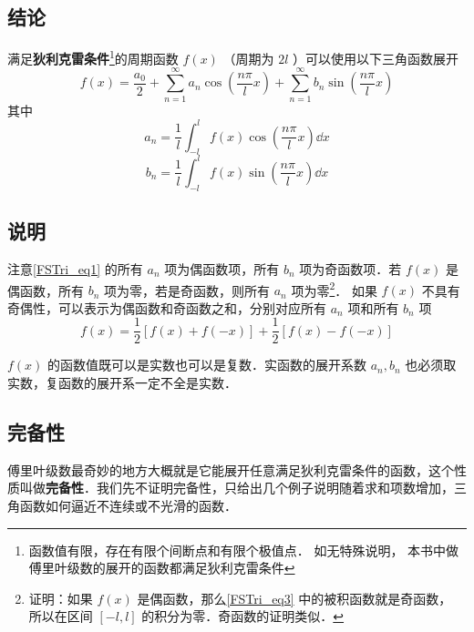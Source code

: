 


\subsection{结论}
满足\textbf{狄利克雷条件}\footnote{函数值有限，存在有限个间断点和有限个极值点． 如无特殊说明， 本书中做傅里叶级数的展开的函数都满足狄利克雷条件}的周期函数 $f(x)$ （周期为 $2l$ ）可以使用以下三角函数展开
\begin{equation}\label{FSTri_eq1}
f( x ) = \frac{a_0}{2} + \sum_{n = 1}^\infty a_n \cos (\frac{n\pi}{l}x) + \sum_{n = 1}^\infty b_n \sin (\frac{n\pi}{l}x)
\end{equation}
其中
\begin{equation}\label{FSTri_eq2}
a_n = \frac{1}{l} \int_{ - l}^l f( x )\cos(\frac{n\pi}{l}x) \dd{x} 
\end{equation}
\begin{equation}\label{FSTri_eq3}
b_n = \frac{1}{l} \int_{ - l}^l f( x )\sin(\frac{n\pi}{l}x) \dd{x}
\end{equation}

\subsection{说明}
注意\autoref{FSTri_eq1} 的所有 $a_n$ 项为偶函数项，所有 $b_n$ 项为奇函数项．若 $f(x)$ 是偶函数，所有 $b_n$ 项为零，若是奇函数，则所有 $a_n$ 项为零\footnote{证明：如果 $f(x)$ 是偶函数，那么\autoref{FSTri_eq3} 中的被积函数就是奇函数， 所以在区间 $[-l,l]$ 的积分为零．奇函数的证明类似．}． 如果 $f(x)$ 不具有奇偶性，可以表示为偶函数和奇函数之和，分别对应所有 $a_n$ 项和所有 $b_n$ 项
\begin{equation}
f(x) = \frac12 [f(x)+f(-x)] + \frac12 [f(x)-f(-x)]
\end{equation}

$f(x)$ 的函数值既可以是实数也可以是复数．实函数的展开系数 $a_n, b_n$ 也必须取实数，复函数的展开系一定不全是实数．

\subsection{完备性}
傅里叶级数最奇妙的地方大概就是它能展开任意满足狄利克雷条件的函数，这个性质叫做\textbf{完备性}．我们先不证明完备性，只给出几个例子说明随着求和项数增加，三角函数如何逼近不连续或不光滑的函数．

